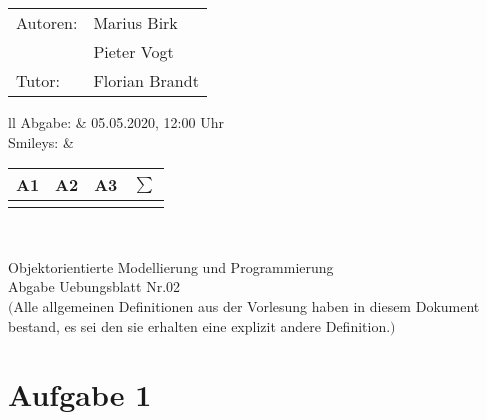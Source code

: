 \documentclass[12pt,a4paper,oneside,ngerman]{article}
\newcommand{\fach}{Objektorientierte Modellierung und Programmierung}
\newcommand{\dokumentenTitel}{Abgabe Uebungsblatt Nr.02}
\newcommand{\Abgabe}{05.05.2020, 12:00 Uhr}
\newcommand{\memberOne}{Marius Birk}
\newcommand{\memberTwo}{Pieter Vogt}
\newcommand{\tutor}{ Florian Brandt }
\begin{document}
	\thispagestyle{plain} %
	
	\begin{multicols}{2} %
		\hspace{-1cm} %
		\begin{tabular}{ll} %
			Autoren: & \memberOne \\ %
			& \memberTwo \\
			Tutor: & \tutor \\  
		\end{tabular}
		
		\columnbreak %
		\hspace{-1cm} %
		\begin{tabular}{ll} %
			Abgabe: & \Abgabe \\ %
			Smileys: &  
			\renewcommand{\arraystretch}{1.2} 
			\begin{tabular}{|p{0.8cm}|p{0.8cm}|p{0.8cm}|p{0.8cm}|}
				\hline A1 & A2 & A3 & $\sum\limits^{ }$ \\ \hline
				& & & \\ \hline    
			\end{tabular} \\
		\end{tabular}
		
	\end{multicols} %
	
	\begin{center}
		\Large{\fach} \\
		\LARGE{\dokumentenTitel} \\
		\small
		$($Alle allgemeinen Definitionen aus der Vorlesung haben in diesem Dokument bestand, es sei den sie erhalten eine explizit andere Definition.$)$
    \end{center}

	\section{Aufgabe 1}
\end{document}
